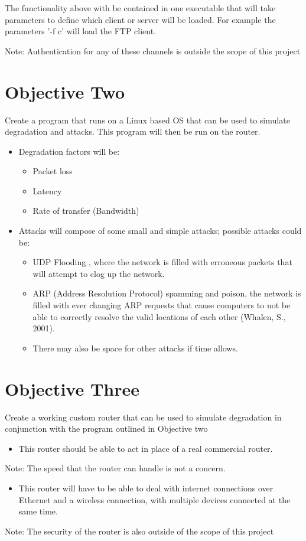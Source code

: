 The functionality above with be contained in one executable that will take parameters to define which client or server will be loaded. For example the parameters '-f c' will load the FTP client.

Note: Authentication for any of these channels is outside the scope of this project


\section{Objective Two}
\label{sec:obj2}
\label{ref:obj2}
Create a program that runs on a Linux based OS that can be used to simulate degradation and attacks. This program will then be run on the router.

\begin{itemize}
\item Degradation factors will be:
	\begin{itemize}
	\item Packet loss
	\item Latency
	\item Rate of transfer (Bandwidth)
	\end{itemize}
\item Attacks will compose of some small and simple attacks; possible attacks could be:
	\begin{itemize}
	\item UDP Flooding \citep{xiaoming2010denial}, where the network is filled with erroneous packets that will attempt to clog up the network.
	\item ARP (Address Resolution Protocol) spamming and poison, the network is filled with ever changing ARP requests that cause computers to not be able to correctly resolve the 	valid locations of each other (Whalen, S., 2001).
	\item There may also be space for other attacks if time allows.
	\end{itemize}
\end{itemize}

\section{Objective Three}
\label{ref:obj3}
Create a working custom router that can be used to simulate degradation in conjunction with the program outlined in Objective two

\begin{itemize}
\item This router should be able to act in place of a real commercial router. 
\end{itemize}
Note: The speed that the router can handle is not a concern.
\begin{itemize}
\item This router will have to be able to deal with internet connections over Ethernet and a wireless connection, with multiple devices connected at the same time.
\end{itemize}
Note: The security of the router is also outside of the scope of this project

